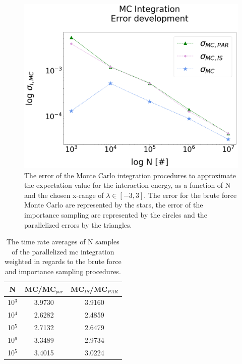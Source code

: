 \documentclass[%
reprint,nofootinbib,
amsmath,amssymb,
aps,
]{revtex4-1}
\begin{document}
\begin{figure}[H]
		\vspace{16mm}
	\includegraphics[width=\columnwidth]{MC_integration_error.png}
	\caption{\label{mc_err} The error of the Monte Carlo integration procedures to approximate the expectation value for the interaction energy, as a function of N and the chosen x-range of $\lambda \in[-3,3]$. The error for the brute force Monte Carlo are represented by the stars, the error of the importance sampling are represented by the circles and the parallelized errors by the triangles.}
\end{figure} 
\newpage 
\begin{table}[H]
	\caption{\label{time_mc_tab} The time rate averages of N samples of the parallelized mc integration weighted in regards to the brute force and importance sampling procedures.}
	\centering 
	\begin{tabular}{|c|c|c|}
		\hline 
		\hspace{1mm}\textbf{N} \hspace{1mm}& \hspace{1mm} \textbf{MC/MC$_{par}$} \hspace{1mm} & \hspace{1mm}\textbf{MC$_{IS}$/MC$_{PAR}$} \hspace{1mm} \\ \hline 
10$^3$ & 3.9730  & 3.9160  \\
10$^4$ & 2.6282  & 2.4859  \\
10$^5$ & 2.7132  & 2.6479  \\
10$^6$ & 3.3489  & 2.9734  \\
10$^5$ & 3.4015  & 3.0224  \\
		\hline 
	\end{tabular} \\ 
\end{table}
\end{document}
